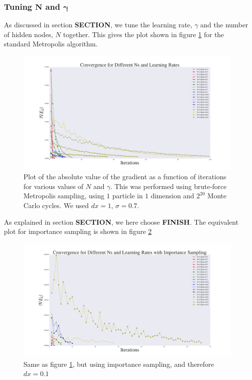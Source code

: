 \documentclass[a4paper, 10pt]{article}
\begin{document}
\subsubsection{Tuning $\boldsymbol{N}$ and $\boldsymbol{\gamma}$}
As discussed in section \textbf{SECTION}, we tune the learning rate, $\gamma$ and the number of hidden nodes, $N$ together. This gives the plot shown in figure \ref{fig:step_size_and_N_standard} for the standard Metropolis algorithm.
\begin{figure}
\centering
\includegraphics[width=\textwidth]{../Results/grad_normal.pdf}
\caption{Plot of the absolute value of the gradient as a function of iterations for various values of $N$ and $\gamma$. This was performed using brute-force Metropolis sampling, using $1$ particle in $1$ dimension and $2^{20}$ Monte Carlo cycles. We used $dx=1$, $\sigma=0.7$.}\label{fig:step_size_and_N_standard}
\end{figure}
As explained in section \textbf{SECTION}, we here choose \textbf{FINISH}.
The equivalent plot for importance sampling is shown in figure \ref{fig:step_size_and_N_importance}
\begin{figure}
	\centering
	\includegraphics[width=\textwidth]{../Results/grad_importance.pdf}
	\caption{Same as figure \ref{fig:step_size_and_N_standard}, but using importance sampling, and therefore $dx=0.1$}\label{fig:step_size_and_N_importance}
\end{figure}
\end{document}

